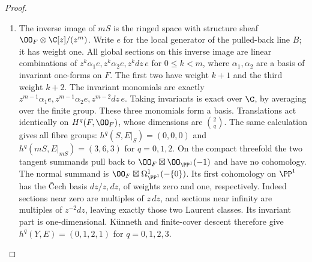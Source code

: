 \begin{proof}
\begin{enumerate}[label={$\langle1\rangle$\arabic*.},leftmargin=*]
\item The inverse image of $mS$ is the ringed space with structure sheaf $\OO_F\otimes\C[z]/(z^m)$. Write $e$ for the local generator of the pulled-back line $B$; it has weight one. All global sections on this inverse image are linear combinations of $z^k\alpha_1e,z^k\alpha_2e,z^kdz\,e$ for $0\le k<m$, where $\alpha_1,\alpha_2$ are a basis of invariant one-forms on $F$. The first two have weight $k+1$ and the third weight $k+2$. The invariant monomials are exactly
$z^{m-1}\alpha_1e,z^{m-1}\alpha_2e,z^{m-2}dz\,e$.
Taking invariants is exact over $\C$, by averaging over the finite group. These three monomials form a basis. Translations act identically on $H^q(F,\OO_F)$, whose dimensions are $\binom{2}{q}$. The same calculation gives all fibre groups: $h^q(S,E|_S)=(0,0,0)$ and $h^q(mS,E|_{mS})=(3,6,3)$ for $q=0,1,2$. On the compact threefold the two tangent summands pull back to $\OO_F\boxtimes\OO_{\PP^1}(-1)$ and have no cohomology. The normal summand is $\OO_F\boxtimes\Omega^1_{\PP^1}(-\{0\})$. Its first cohomology on $\PP^1$ has the \v Cech basis $dz/z,dz$, of weights zero and one, respectively. Indeed sections near zero are multiples of $z\,dz$, and sections near infinity are multiples of $z^{-2}dz$, leaving exactly those two Laurent classes. Its invariant part is one-dimensional. K\"unneth and finite-cover descent therefore give $h^q(Y,E)=(0,1,2,1)$ for $q=0,1,2,3$.

\end{enumerate}
\end{proof}